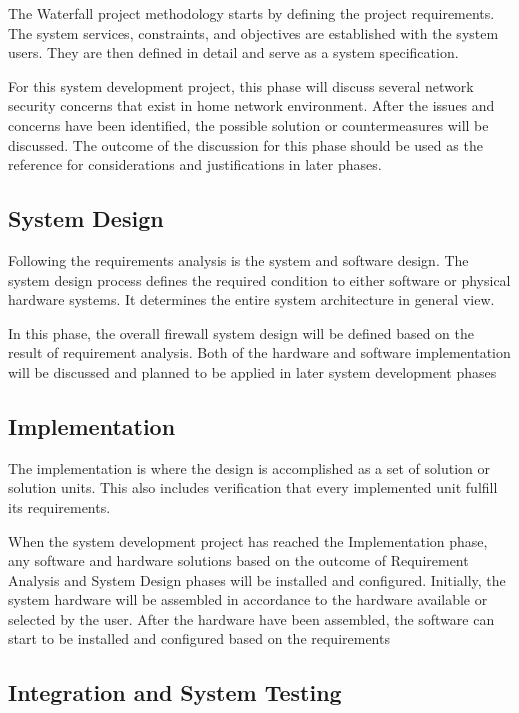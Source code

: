 \documentclass[../index.tex]{subfiles}
\begin{document}
The Waterfall project methodology starts by defining the project requirements. The system services,
constraints, and objectives are established with the system users. They are then defined in detail
and serve as a system specification.

For this system development project, this phase will discuss several network security concerns that
exist in home network environment. After the issues and concerns have been identified, the possible
solution or countermeasures will be discussed. The outcome of the discussion for this phase should
be used as the reference for considerations and justifications in later phases.

\subsection{System Design}

Following the requirements analysis is the system and software design. The system design process
defines the required condition to either software or physical hardware systems. It determines the
entire system architecture in general view.

In this phase, the overall firewall system design will be defined based on the result of requirement
analysis. Both of the hardware and software implementation will be discussed and planned to be
applied in later system development phases

\subsection{Implementation}

The implementation is where the design is accomplished as a set of solution or solution units. This
also includes verification that every implemented unit fulfill its requirements.

When the system development project has reached the Implementation phase, any software and hardware
solutions based on the outcome of Requirement Analysis and System Design phases will be installed
and configured. Initially, the system hardware will be assembled in accordance to the hardware
available or selected by the user. After the hardware have been assembled, the software can start to
be installed and configured based on the requirements


\subsection{Integration and System Testing}
\end{document}
